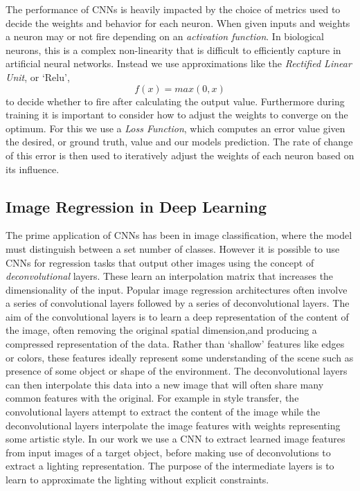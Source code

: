 \documentclass[ %
                    author={Gavin Parker},
                supervisor={Dr. Neill Campbell},
                    degree={MEng},
                     title={Deep Learning for Illumination Estimation from Stereo Images},
                  subtitle={},
                      type={Research},
                      year={2018} ]{dissertation}
\begin{document}
\newline
The performance of CNNs is heavily impacted by the choice of metrics used to decide the weights and behavior for each neuron. When given inputs and weights a neuron may or not fire depending on an \textit{activation function}. In biological neurons, this is a complex non-linearity that is difficult to efficiently capture in artificial neural networks. Instead we use approximations like the \textit{Rectified Linear Unit}, or `Relu',
\[f(x) = max(0,x)\]
to decide whether to fire after calculating the output value. Furthermore during training it is important to consider how to adjust the weights to converge on the optimum. For this we use a \textit{Loss Function}, which computes an error value given the desired, or ground truth, value and our models prediction. The rate of change of this error is then used to iteratively adjust the weights of each neuron based on its influence.
\subsection{Image Regression in Deep Learning}
The prime application of CNNs has been in image classification, where the model must distinguish between a set number of classes. However it is possible to use CNNs for regression tasks that output other images using the concept of \textit{deconvolutional} layers. These learn an interpolation matrix that increases the dimensionality of the input. Popular image regression architectures often involve a series of convolutional layers followed by a series of deconvolutional layers. The aim of the convolutional layers is to learn a deep representation of the content of the image, often removing the original spatial dimension,and producing a compressed representation of the data. Rather than `shallow' features like edges or colors, these features ideally represent some understanding of the scene such as presence of some object or shape of the environment. The deconvolutional layers can then interpolate this data into a new image that will often share many common features with the original. For example in style transfer, the convolutional layers attempt to extract the content of the image while the deconvolutional layers interpolate the image features with weights representing some artistic style. In our work we use a CNN to extract learned image features from input images of a target object, before making use of deconvolutions to extract a lighting representation. The purpose of the intermediate layers is to learn to approximate the lighting without explicit constraints.
\end{document}
